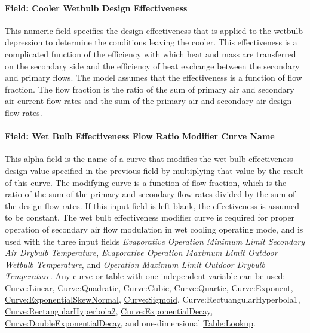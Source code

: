 \paragraph{Field: Cooler Wetbulb Design Effectiveness}\label{field-cooler-wetbulb-design-effectiveness}

This numeric field specifies the design effectiveness that is applied to the wetbulb depression to determine the conditions leaving the cooler. This effectiveness is a complicated function of the efficiency with which heat and mass are transferred on the secondary side and the efficiency of heat exchange between the secondary and primary flows. The model assumes that the effectiveness is a function of flow fraction. The flow fraction is the ratio of the sum of primary air and secondary air current flow rates and the sum of the primary air and secondary air design flow rates.

\paragraph{Field: Wet Bulb Effectiveness Flow Ratio Modifier Curve Name}\label{field-wet-bulb-effectiveness-flow-ratio-modifier-curve-name}

This alpha field is the name of a curve that modifies the wet bulb effectiveness design value specified in the previous field by multiplying that value by the result of this curve. The modifying curve is a function of flow fraction, which is the ratio of the sum of the primary and secondary flow rates divided by the sum of the design flow rates. If this input field is left blank, the effectiveness is assumed to be constant. The wet bulb effectiveness modifier curve is required for proper operation of secondary air flow modulation in wet cooling operating mode, and is used with the three input fields \textit{Evaporative Operation Minimum Limit Secondary Air Drybulb Temperature}, \textit{Evaporative Operation Maximum Limit Outdoor Wetbulb Temperature}, and \textit{Operation Maximum Limit Outdoor Drybulb Temperature}. Any curve or table with one independent variable can be used: \hyperref[curvelinear]{Curve:Linear}, \hyperref[curvequadratic]{Curve:Quadratic}, \hyperref[curvecubic]{Curve:Cubic}, \hyperref[curvequartic]{Curve:Quartic}, \hyperref[curveexponent]{Curve:Exponent}, \hyperref[curveexponentialskewnormal]{Curve:ExponentialSkewNormal}, \hyperref[curvesigmoid]{Curve:Sigmoid}, Curve:RectuangularHyperbola1, \hyperref[curverectangularhyperbola2]{Curve:RectangularHyperbola2}, \hyperref[curveexponentialdecay]{Curve:ExponentialDecay}, \hyperref[curvedoubleexponentialdecay]{Curve:DoubleExponentialDecay}, and one-dimensional \hyperref[tablelookup]{Table:Lookup}.

